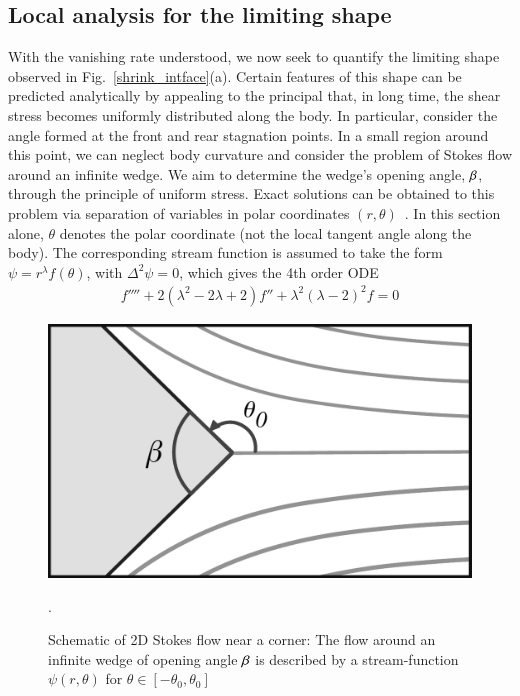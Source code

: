 \documentclass[preprint, 10pt]{elsarticle}
\begin{document}

\subsection{Local analysis for the limiting shape}

With the vanishing rate understood, we now seek to quantify the limiting shape observed in Fig.~\ref{shrink_intface}(a). Certain features of this shape can be predicted analytically by appealing to the principal that, in long time, the shear stress becomes uniformly distributed along the body. In particular, consider the angle formed at the front and rear stagnation points. In a small region around this point, we can neglect body curvature and consider the problem of Stokes flow around an infinite wedge. We aim to determine the wedge's opening angle, $\beta$, through the principle of uniform stress. Exact solutions can be obtained to this problem via separation of variables in polar coordinates $(r, \theta)$~\cite{poz1997}. In this section alone, $\theta$ denotes the polar coordinate (not the local tangent angle along the body). The corresponding stream function is assumed to take the form $\psi = r^{\lambda}f(\theta)$, with $\Delta^2 \psi = 0$, which gives the 4th order ODE~\cite{poz1997}
\begin{align*}
  f'''' + 2(\lambda^2 - 2 \lambda + 2)f'' + \lambda^2(\lambda-2)^2 f = 0
\end{align*}

\begin{figure}%
\begin{center}
\includegraphics[width = 0.4 \textwidth]{./figs/corner.pdf}
\caption{Schematic of 2D Stokes flow near a corner: The flow around an infinite wedge of opening angle $\beta$ is described by a stream-function $\psi(r,\theta)$ for $\theta \in [-\theta_0, \theta_0]$}.
\label{corner}
\end{center}
\end{figure}
 
\end{document}
